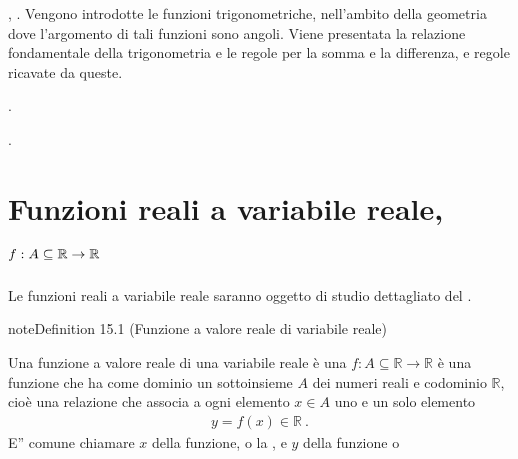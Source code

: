 \documentclass[letterpaper,10pt,italian]{jupyterBook}
\begin{document}
\sphinxAtStartPar
{\hyperref[\detokenize{ch/trigonometry:math-hs-trigonometry}]{}}, . Vengono introdotte le funzioni trigonometriche, nell’ambito della geometria dove l’argomento di tali funzioni sono angoli. Viene presentata la relazione fondamentale della trigonometria e le regole per la somma e la differenza, e regole ricavate da queste.

\sphinxAtStartPar
{\hyperref[\detokenize{ch/precalculus/polynomials:math-hs-precalculus-polynomials}]{}}. 

\sphinxAtStartPar
{\hyperref[\detokenize{ch/algebra/complex-algebra:math-hs-algebra-complex}]{}}. 



\sphinxstepscope




\chapter{Funzioni reali a variabile reale, \protect\(f: A \subseteq \mathbb{R} \rightarrow \mathbb{R}\protect\)}
\label{\detokenize{ch/precalculus/real-functions:funzioni-reali-a-variabile-reale-f-a-subseteq-mathbb-r-rightarrow-mathbb-r}}\label{\detokenize{ch/precalculus/real-functions:math-hs-precalculus-real-functions}}\label{\detokenize{ch/precalculus/real-functions::doc}}
\sphinxAtStartPar
Le funzioni reali a variabile reale saranno oggetto di studio dettagliato del {\hyperref[\detokenize{ch/infinitesimal_calculus/analysis:infinitesimal-calculus-analysis}]{}}.
\label{ch/precalculus/real-functions:precalculus-real-fun}
\begin{sphinxadmonition}{note}{Definition 15.1 (Funzione a valore reale di variabile reale)}



\sphinxAtStartPar
Una funzione a valore reale di una variabile reale è una {\hyperref[\detokenize{ch/set:math-hs-fun}]{}} \(f: A \subseteq \mathbb{R} \rightarrow \mathbb{R}\) è una funzione che ha come dominio un sottoinsieme \(A\) dei numeri reali e codominio \(\mathbb{R}\), cioè una relazione che associa a ogni elemento \(x \in A\) uno e un solo elemento
\begin{equation*}
\begin{split}y = f(x) \in \mathbb{R} \ .\end{split}
\end{equation*}
\sphinxAtStartPar
E” comune chiamare \(x\)  della funzione, o la , e \(y\)  della funzione o 
\end{sphinxadmonition}
\end{document}
